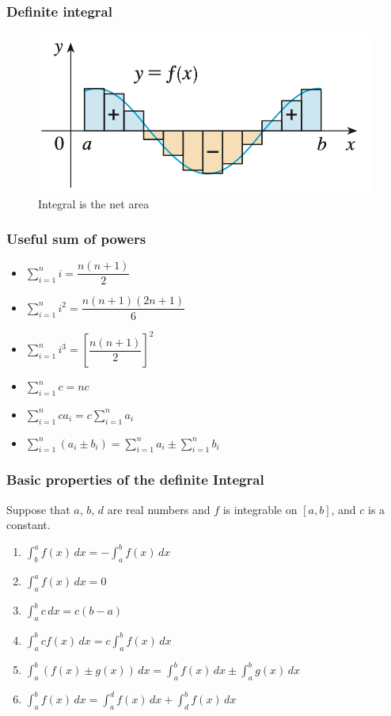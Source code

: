 \documentclass[t]{beamer}
\theoremstyle{plain}
\theoremstyle{definition}
\newcommand{\ds}{\displaystyle}
\begin{document}
\begin{frame}
\frametitle{Definite integral}

\begin{figure}[t]
\begin{center}
\includegraphics[scale=0.6]{fig/integral}
\caption{Integral is the net area}
\end{center}
\end{figure}

\end{frame}

\begin{frame}
\frametitle{Useful sum of powers}

\footnotesize
\everymath{\displaystyle}
\begin{itemize}
\item $\sum_{i=1}^{n}i = \dfrac{n(n+1)}{2}$
\item $\sum_{i=1}^{n}i^2 = \dfrac{n(n+1)(2n+1)}{6}$
\item $\sum_{i=1}^{n}i^3 = \left[\dfrac{n(n+1)}{2}\right]^2$
\item $\sum_{i=1}^{n}c = nc$
\item $\sum_{i=1}^{n}ca_i = c\sum_{i=1}^{n}a_i$
\item $\sum_{i=1}^{n}(a_i \pm b_i) = \sum_{i=1}^{n}a_i \pm \sum_{i=1}^{n}b_i$
\end{itemize}

\end{frame}


\begin{frame}
\frametitle{Basic properties of the definite Integral}

\footnotesize

 Suppose that $a$, $b$, $d$ are real numbers and $f$ is integrable on $[a,b]$, and $c$ is a constant.
\begin{enumerate}
\item $\ds\int_b^af(x)\,dx = \ds-\int_a^bf(x)\,dx$
\item $\ds\int_a^af(x)\,dx = 0$
\item $\ds\int_{a}^{b}c \,dx = c(b-a)$
\item $\ds\int_{a}^{b}c f(x) \,dx = c\ds\int_{a}^{b}f(x)\,dx$
\item $\ds\int_a^b(f(x) \pm g(x))\,dx= \int_a^b f(x) \,dx \pm \int_a^b g(x)\,dx$
\item $\ds\int_{a}^{b} f(x)\,dx = \int_{a}^{d}f(x)\,dx + \int_{d}^{b}f(x)\,dx$
\end{enumerate}
\end{frame}
\end{document}
